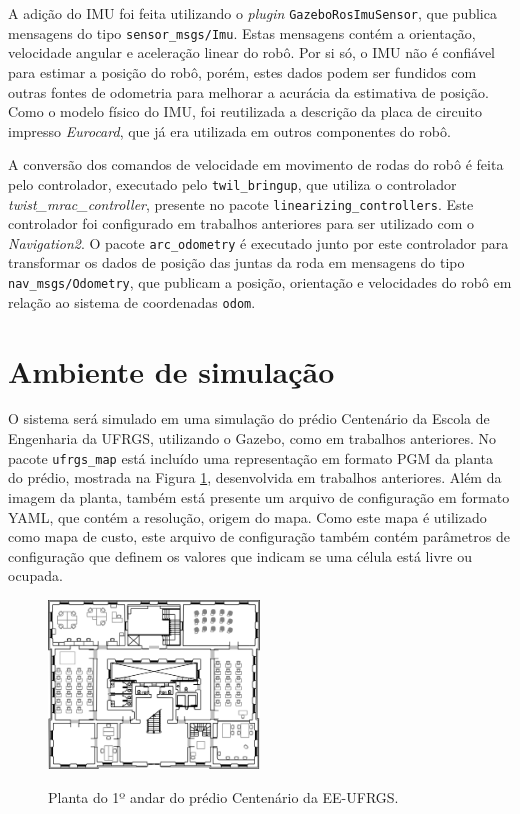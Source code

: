 \documentclass[repeatfields,xlists,xpacks,oneside,yearsonly]{ufrgscca}
\begin{document}
A adição do IMU foi feita utilizando o \textit{plugin}
\texttt{GazeboRosImuSensor}, que publica mensagens do tipo
\texttt{sensor\_msgs/Imu}. Estas mensagens contém a orientação,
velocidade angular e aceleração linear do robô. Por si só, o IMU não
é confiável para estimar a posição do robô, porém, estes dados podem
ser fundidos com outras fontes de odometria para melhorar a acurácia
da estimativa de posição. Como o modelo físico do IMU, foi
reutilizada a descrição da placa de circuito impresso
\textit{Eurocard}, que já era utilizada em outros componentes do
robô.

A conversão dos comandos de velocidade em movimento de rodas do robô
é feita pelo controlador, executado pelo \texttt{twil\_bringup}, que
utiliza o controlador \textit{twist\_mrac\_controller}, presente no
pacote \texttt{linearizing\_controllers}. Este controlador foi
configurado em trabalhos anteriores para ser utilizado com o
\textit{Navigation2}. O pacote \texttt{arc\_odometry} é executado
junto por este controlador para transformar os dados de posição das
juntas da roda em mensagens do tipo \texttt{nav\_msgs/Odometry}, que
publicam a posição, orientação e velocidades do robô em relação ao
sistema de coordenadas \texttt{odom}.

\section{Ambiente de simulação}

O sistema será simulado em uma simulação do prédio Centenário da
Escola de Engenharia da UFRGS, utilizando o Gazebo, como em trabalhos
anteriores. No pacote \texttt{ufrgs\_map} está incluído uma
representação em formato PGM da planta do prédio, mostrada na Figura
\ref{fig:planta_centenario}, desenvolvida em trabalhos anteriores.
Além da imagem da planta, também está presente um arquivo de
configuração em formato YAML, que contém a resolução, origem do mapa.
Como este mapa é utilizado como mapa de custo, este arquivo de
configuração também contém parâmetros de configuração que definem os
valores que indicam se uma célula está livre ou ocupada. 

\begin{figure}[h]
    {
        \centering
        \caption{Planta do 1º andar do prédio Centenário da EE-UFRGS.}
        \label{fig:planta_centenario}
        \includegraphics[width=0.5\textwidth]{centenario_floor_plan.png}\\
    }
    {}
\end{figure}
\end{document}
